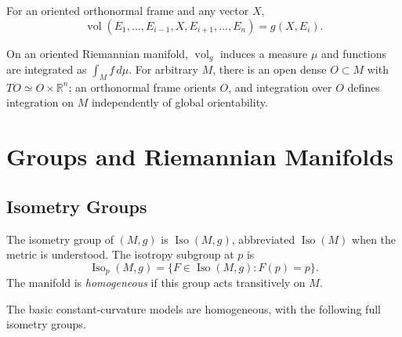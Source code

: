 \begin{remark}
  \label{rem:pet-ch1-height-base}
  \leanok
  For an oriented orthonormal frame and any vector $X$,
  \[
    \operatorname{vol}(E_1,\ldots,E_{i-1},X,E_{i+1},\ldots,E_n)
      =g(X,E_i).
  \]
\end{remark}

\begin{remark}
  \label{rem:pet-ch1-integration-riemannian}
  \leanok
  On an oriented Riemannian manifold, $\operatorname{vol}_g$ induces a measure
  $\mu$ and functions are integrated as $\int_M f\,d\mu$. For arbitrary $M$,
  there is an open dense $O\subset M$ with
  $TO\simeq O\times\mathbb{R}^n$; an orthonormal frame orients $O$, and
  integration over $O$ defines integration on $M$ independently of global
  orientability.
\end{remark}

\section{Groups and Riemannian Manifolds}

\subsection{Isometry Groups}

\begin{definition}
  \label{def:pet-ch1-isometry-group}
  \leanok
  The isometry group of $(M,g)$ is $\operatorname{Iso}(M,g)$, abbreviated
  $\operatorname{Iso}(M)$ when the metric is understood. The isotropy subgroup
  at $p$ is
  \[
    \operatorname{Iso}_p(M,g)=\{F\in\operatorname{Iso}(M,g):F(p)=p\}.
  \]
  The manifold is \emph{homogeneous} if this group acts transitively on $M$.
\end{definition}

The basic constant-curvature models are homogeneous, with the following full
isometry groups.

